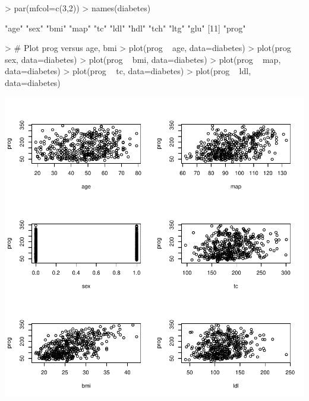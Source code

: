 \documentclass{article}
\begin{document}
\begin{Schunk}
\begin{Sinput}
> par(mfcol=c(3,2))
> names(diabetes)
\end{Sinput}
\begin{Soutput}
 [1] "age"  "sex"  "bmi"  "map"  "tc"   "ldl"  "hdl"  "tch"  "ltg"  "glu" 
[11] "prog"
\end{Soutput}
\begin{Sinput}
> #   Plot prog versus age, bmi
> plot(prog ~ age, data=diabetes)
> plot(prog ~ sex, data=diabetes)
> plot(prog ~ bmi, data=diabetes)
> plot(prog ~ map, data=diabetes)
> plot(prog ~ tc, data=diabetes)
> plot(prog ~ ldl, data=diabetes)
\end{Sinput}
\end{Schunk}
\includegraphics{RProject1_IntroToR_Diabetes-002}
\end{document}
